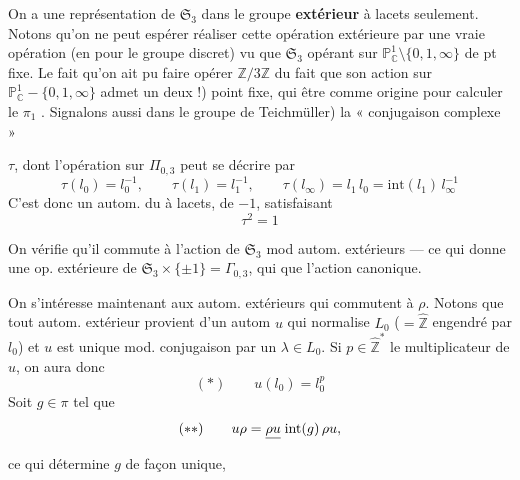 \documentclass[11pt,a4paper]{article}
\begin{document}
On a une représentation de $\mathfrak{S}_3$ dans le groupe
\textbf{extérieur} à lacets seulement. Notons qu'on ne peut espérer réaliser
cette opération extérieure par une vraie opération (en  pour
le groupe discret) vu que $\mathfrak{S}_3$ opérant sur
$\mathbb{P}^1_{\mathbb{C}} \setminus \{0, 1, \infty\}$ 
de pt fixe. Le fait qu'on ait pu faire opérer
 $\mathbb{Z}/3\mathbb{Z}$ 
du fait que son action sur $\mathbb{P}^1_{\mathbb{C}} - \{0, 1, \infty\}$ admet
un  deux !) point fixe, qui  être
\struck{\ill{}}  comme origine pour calculer le $\pi_1$
.
Signalons aussi   dans le groupe
 de Teichmüller) la
« conjugaison complexe »



$\tau$, dont l'opération sur $\Pi_{0,3}$ peut se décrire par
\[
\tau(l_0) = l_0^{-1}, \qquad \tau(l_1) = l_1^{-1}, \qquad
\tau(l_\infty) = l_1\, l_0 = \mathrm{int}(l_1)\, l_\infty^{-1}
\]
C'est donc un autom. du  à lacets, de
 $-1$, satisfaisant
\[
\tau^2 = 1
\]

On vérifie qu'il commute à l'action de $\mathfrak{S}_3$ mod autom.
extérieurs — ce qui donne une op. extérieure de
$\mathfrak{S}_3 \times \{\pm 1\} = \Gamma_{0,3}$, qui  que l'action canonique.

On s'intéresse maintenant aux autom. extérieurs qui commutent à $\rho$.
Notons que tout autom. extérieur provient d'un autom $u$ qui normalise
$L_0$ ($= \hat{\mathbb{Z}}$ engendré par $l_0$)
et $u$ est unique mod. conjugaison par un $\lambda \in L_0$. Si
$p \in \hat{\mathbb{Z}}^{*}$    le
multiplicateur de $u$, on aura donc
\[
(*) \qquad u(l_0) = l_0^{p}
\]
Soit $g \in \pi$ tel que
\[
(**) \qquad u\rho = \struck{\rho u}\; \mathrm{int}(g)\, \rho u ,
\]
ce qui détermine $g$ de façon unique,  
\ill{}
\end{document}
